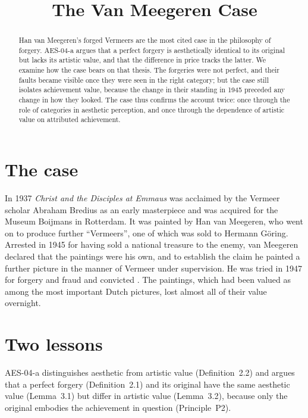 \documentclass{situationist-preprint}
\title{The Van Meegeren Case}
\begin{document}
\maketitle

\begin{abstract}
Han van Meegeren's forged Vermeers are the most cited case in the philosophy of forgery. AES-04-a argues that a perfect forgery is aesthetically identical to its original but lacks its artistic value, and that the difference in price tracks the latter. We examine how the case bears on that thesis. The forgeries were not perfect, and their faults became visible once they were seen in the right category; but the case still isolates achievement value, because the change in their standing in 1945 preceded any change in how they looked. The case thus confirms the account twice: once through the role of categories in aesthetic perception, and once through the dependence of artistic value on attributed achievement.
\end{abstract}

\section{The case}

In 1937 \emph{Christ and the Disciples at Emmaus} was acclaimed by the Vermeer scholar Abraham Bredius as an early masterpiece and was acquired for the Museum Boijmans in Rotterdam. It was painted by Han van Meegeren, who went on to produce further \enquote{Vermeers}, one of which was sold to Hermann G\"oring. Arrested in 1945 for having sold a national treasure to the enemy, van Meegeren declared that the paintings were his own, and to establish the claim he painted a further picture in the manner of Vermeer under supervision. He was tried in 1947 for forgery and fraud and convicted \citep{Lopez2008}. The paintings, which had been valued as among the most important Dutch pictures, lost almost all of their value overnight.

\section{Two lessons}

AES-04-a distinguishes aesthetic from artistic value (Definition~2.2) and argues that a perfect forgery (Definition~2.1) and its original have the same aesthetic value (Lemma~3.1) but differ in artistic value (Lemma~3.2), because only the original embodies the achievement in question (Principle~P2).
\end{document}
